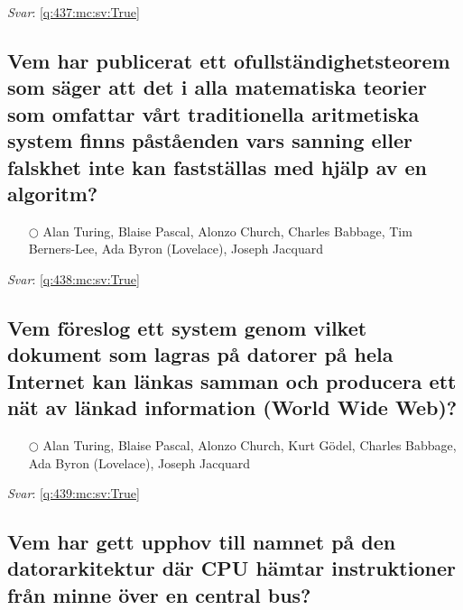 \documentclass[a4paper,11pt,oneside]{article}
\begin{document}
\begin{sloppypar}
\textit{Svar}: \autoref{q:437:mc:sv:True}



\subsection{Vem har publicerat ett ofullst\"andighetsteorem som s\"ager att det i alla matematiska teorier som omfattar v\r{a}rt traditionella aritmetiska system finns p\r{a}st\r{a}enden vars sanning eller falskhet inte kan fastst\"allas med hj\"alp av en algoritm?}

\label{q:438:mc:sv:False}

\begin{itemize}
  \item[$\bigcirc$] Alan Turing, Blaise Pascal, Alonzo Church, Charles Babbage, Tim Berners-Lee, Ada Byron (Lovelace), Joseph Jacquard
\end{itemize}

\vspace{1cm}

\textit{Svar}: \autoref{q:438:mc:sv:True}



\subsection{Vem f\"oreslog ett system genom vilket dokument som lagras p\r{a} datorer p\r{a} hela Internet kan l\"ankas samman och producera ett n\"at av l\"ankad information (World Wide Web)?}

\label{q:439:mc:sv:False}

\begin{itemize}
  \item[$\bigcirc$] Alan Turing, Blaise Pascal, Alonzo Church, Kurt G\"odel, Charles Babbage, Ada Byron (Lovelace), Joseph Jacquard
\end{itemize}

\vspace{1cm}

\textit{Svar}: \autoref{q:439:mc:sv:True}



\subsection{Vem har gett upphov till namnet p\r{a} den datorarkitektur d\"ar CPU h\"amtar instruktioner fr\r{a}n minne \"over en central bus?}

\label{q:440:mc:sv:False}


\end{sloppypar}
\end{document}
